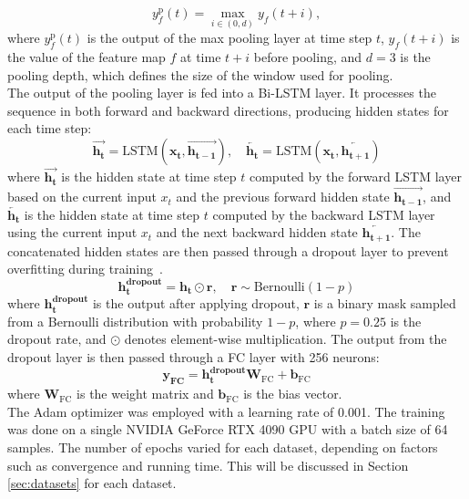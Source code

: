 \documentclass[journal]{IEEEtran}
\begin{document}
\begin{equation}
y_f^{\text{p}}(t) = \max_{i \in (0, d)} y_f(t+i),
\end {equation}
where \(y_f^{\text{p}}(t)\) is the output of the max pooling layer at time step \(t\), \(y_f(t+i)\) is the value of the feature map \(f\) at time \(t+i\) before pooling, and \(d = 3\) is the pooling depth, which defines the size of the window used for pooling.  \\
\noindent The output of the pooling layer is fed into a Bi-LSTM layer. It processes the sequence in both forward and backward directions, producing hidden states for each time step:
\begin{equation}
\overrightarrow{\bm{h_t}} = \text{LSTM}({\bm{x_t}}, \overrightarrow{\bm{h_{t-1}}}), \quad
\overleftarrow{\bm{h_t}} = \text{LSTM}({\bm{x_t}, \overleftarrow{{\bm{h_{t+1}}}}})
\end {equation}
where \( \overrightarrow{\bm{h_t}} \) is the hidden state at time step \( t \) computed by the forward LSTM layer based on the current input \( x_t \) and the previous forward hidden state \( \overrightarrow{\bm{h_{t-1}}} \), and \( \overleftarrow{\bm{h_t}} \) is the hidden state at time step \( t \) computed by the backward LSTM layer using the current input \( x_t \) and the next backward hidden state \( \overleftarrow{\bm{h_{t+1}}} \).
The concatenated hidden states are then passed through a dropout layer to prevent overfitting during training~\cite{srivastava2014dropout}. 
\begin{equation}
\bm{h_t^{\text{dropout}}} = \bm{h_t} \odot \bm{r}, \quad \bm{r} \sim \text{Bernoulli}(1-p)
\end {equation}
where \( \bm{h_t^{\text{dropout}}} \) is the output after applying dropout, \( \bm{r} \) is a binary mask sampled from a Bernoulli distribution with probability \( 1-p \), where \( p = 0.25\) is the dropout rate, and \(\odot\) denotes element-wise multiplication.
The output from the dropout layer is then passed through a FC layer with 256 neurons:
\begin{equation}
\bm{y_{\text{FC}}} = \bm{h_t^{\text{dropout}}}\mathbf{W}_{\text{FC}} + \bm{b}_{\text{FC}} 
\end{equation}
where \( \mathbf{W}_{\text{FC}} \) is the weight matrix and \( \bm{b}_{\text{FC}} \) is the bias vector.\\
%
\noindent The Adam optimizer \cite{kingma2014adam} was employed with a learning rate of 0.001. The training was done on a single NVIDIA GeForce RTX 4090 GPU with a batch size of 64 samples. The number of epochs varied for each dataset, depending on factors such as convergence and running time. This will be discussed in Section \ref{sec:datasets} for each dataset. 
%
\end{document}
